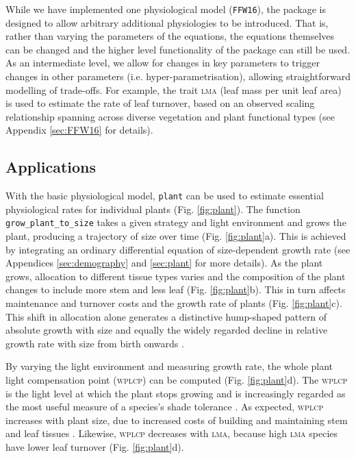 \documentclass[a4paper,11pt]{article}
\newcommand{\plant}{\texttt{plant}}
\begin{document}
While we have implemented one physiological model (\texttt{FFW16}),
the package is designed to allow arbitrary additional physiologies to
be introduced.  That is, rather than varying the parameters of the
equations, the equations themselves can be changed and the higher
level functionality of the package can still be used.  As an
intermediate level, we allow for changes in key parameters to trigger
changes in other parameters (i.e. hyper-parametrisation), allowing
straightforward modelling of trade-offs.  For example, the trait
\textsc{lma} (leaf mass per unit leaf area) is used to estimate the
rate of leaf turnover, based on an observed scaling relationship
spanning across diverse vegetation and plant functional types
\citep{Wright-2004} (see Appendix \ref{sec:FFW16} for details).

\subsection{Applications}

With the basic physiological model, {\plant} can be used to estimate
essential physiological rates for individual plants
(Fig. \ref{fig:plant}). The function \texttt{grow\_plant\_to\_size}
takes a given strategy and light environment and grows the plant,
producing a trajectory of size over time (Fig. \ref{fig:plant}a). This
is achieved by integrating an ordinary differential equation of
size-dependent growth rate (see Appendices \ref{sec:demography} and
\ref{sec:plant} for more details). As the plant grows, allocation to
different tissue types varies and the composition of the plant
changes to include more stem and less leaf
(Fig. \ref{fig:plant}b). This in turn affects maintenance and turnover
costs and the growth rate of plants (Fig. \ref{fig:plant}c).  This
shift in allocation alone generates a distinctive hump-shaped pattern
of absolute growth with size \citep{King-2011} and equally the widely
regarded decline in relative growth rate with size from birth onwards
\citep{Enquist-2007}.

By varying the light environment and measuring growth rate, the whole
plant light compensation point (\textsc{wplcp}) can be computed (Fig.
\ref{fig:plant}d). The \textsc{wplcp} is the light level at which the plant 
stops growing and is increasingly regarded as the most useful
measure of a species's shade tolerance
\citep{Givnish-1988, Baltzer-2007, Lusk-2013}. As expected, \textsc{wplcp}
increases with plant size, due to increased costs of building and
maintaining stem and leaf tissues \citep{Givnish-1988}. Likewise, \textsc{wplcp}
decreases with \textsc{lma}, because high \textsc{lma} species have lower leaf turnover
\citep{Baltzer-2007, Lusk-2013} (Fig.
\ref{fig:plant}d).
\end{document}
